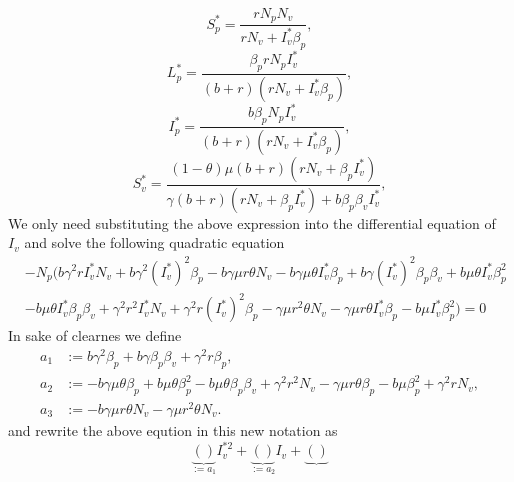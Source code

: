 %
\begin{equation*}
	S^*_p = 
		\frac{
			r N_p N_v
		}{
			r N_v + 
			I ^ *_v 
			\beta_p
		},
\end{equation*}
%
%
\begin{equation*}
	L ^ *_p = 
		\frac{
			\beta_p rN_p I _ v ^ *
		}{
			\left( 
				b + r 
			\right)
			(
				r N_v + I_v ^ * 
				\beta_p
			)
		},
\end{equation*}
%
%
\begin{equation*}
	I ^*_p =
		\frac{
			b \beta_p N_p I_v ^ *
		}{
			 \left(
			 	 b + r 
			 \right)
			 ( r N_v + 
			 	I_v ^ * \beta_p
			 )
		},
\end{equation*}
%
%
\begin{equation*}
	S ^ *_v =
		\frac{
			 \left( 
			 	1 - \theta 
			 \right)
			 \mu(b + r)
			 (rN_v + \beta_p I_v^*)
		}{
			\gamma(b + r)
			(r N_v + \beta_p I^*_v) + 
			b \beta_p \beta_v I_v^*
		},
\end{equation*}
%
%
We only need substituting the above expression into the differential equation 
of $I_v$ and solve the following quadratic equation
%
\begin{equation*}
	\begin{aligned}
			&
			-N_p( 
				b \gamma^2 r I^*_v N_v + 
				b \gamma^2 (I ^*_v)^2 \beta_p -
				b \gamma \mu r \theta N_v - 
				b \gamma \mu \theta I ^ *_v \beta_p + 
				b \gamma (I^*_v)^2 \beta_p \beta_v + 
				b \mu \theta I ^ *_v \beta_p ^ 2
			\\
			&-
				b \mu \theta I ^ *_v \beta_p \beta_v +
				\gamma ^ 2 r ^ 2 I ^ *_v N_v +
				\gamma ^ 2 r (I ^ *_v) ^ 2 \beta_p - 
				\gamma\mu r^2 \theta N_v - 
				\gamma\mu r \theta I^*_v 
				\beta_p - b\mu I^*_v \beta_p^2) = 0
	\end{aligned}
\end{equation*}
% 
In sake of clearnes we define 
\begin{align*}
	a_1 &:= b \gamma^2 \beta_p+b \gamma \beta_p\beta_v+\gamma^2 r \beta_p,\\
	a_2 &:=-b\gamma\mu\theta\beta_p+b\mu\theta\beta_p^2-b\mu\theta\beta_p\beta_v+\gamma^2 r^2 N_v-\gamma\mu r \theta\beta_p-b\mu\beta_p^2+\gamma^2 r N_v,\\
	a_3 &:=-b\gamma\mu r\theta N_v-\gamma\mu r^2\theta N_v.
\end{align*}
%
and rewrite the above eqution in this new notation as
\begin{equation}
	\underbrace{
		()
	}_{:=a_1}
	I_v^{*2} + 
	\underbrace{()}_{:=a_2} I_v + 
	\underbrace{()} 
\end{equation}
